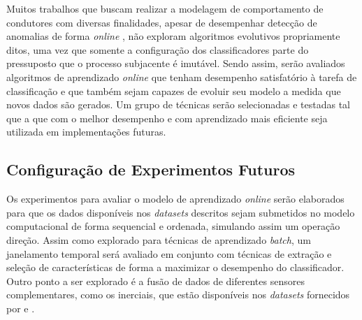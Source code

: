 
Muitos trabalhos que buscam realizar a modelagem de comportamento de condutores com diversas finalidades, apesar de desempenhar detecção de anomalias de forma \textit{online} \cite{jian2014research} , não exploram algoritmos evolutivos propriamente ditos, uma vez que somente a configuração dos classificadores parte do pressuposto que o processo subjacente é imutável. Sendo assim, serão avaliados algoritmos de aprendizado \textit{online} que tenham desempenho satisfatório à tarefa de classificação e que também sejam capazes de evoluir seu modelo a medida que novos dados são gerados. Um grupo de técnicas serão selecionadas e testadas tal que a que com o melhor desempenho e com aprendizado mais eficiente seja utilizada em implementações futuras.

\subsection{Configuração de Experimentos Futuros}

Os experimentos para avaliar o modelo de aprendizado \textit{online} serão elaborados para que os dados disponíveis nos \textit{datasets} descritos sejam submetidos no modelo computacional de forma sequencial e ordenada, simulando assim um operação direção. Assim como explorado para técnicas de aprendizado \textit{batch}, um janelamento temporal será avaliado em conjunto com técnicas de extração e seleção de características de forma  a maximizar o desempenho do classificador. Outro ponto a ser explorado é a fusão de dados de diferentes sensores complementares, como os inerciais, que estão disponíveis nos \textit{datasets} fornecidos por  e .














